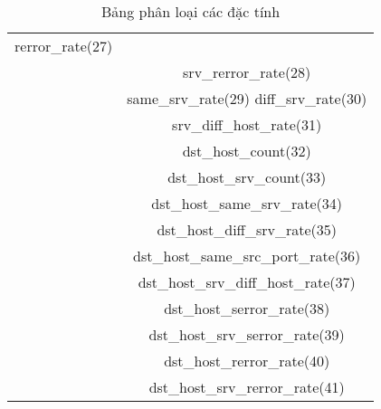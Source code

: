 \begin{table}[!h]
\begin{center}
\begin{tabular}{ | c | c | }
			rerror\_rate(27)                                \\ &
			srv\_rerror\_rate(28)                           \\ &
			same\_srv\_rate(29)
			diff\_srv\_rate(30)                             \\ &
			srv\_diff\_host\_rate(31)                       \\ &
			dst\_host\_count(32)                            \\ &
			dst\_host\_srv\_count(33)                       \\ &
			dst\_host\_same\_srv\_rate(34)                  \\ &
			dst\_host\_diff\_srv\_rate(35)                  \\ &
			dst\_host\_same\_src\_port\_rate(36)            \\ &
			dst\_host\_srv\_diff\_host\_rate(37)            \\ &
			dst\_host\_serror\_rate(38)                     \\ &
			dst\_host\_srv\_serror\_rate(39)                \\ &
			dst\_host\_rerror\_rate(40)                     \\ &
			dst\_host\_srv\_rerror\_rate(41)                \\
			\hline
		\end{tabular}

	\end{center}
	\caption{Bảng phân loại các đặc tính \cite{machinelearning}}
	\label{table:1}
\end{table}
\FloatBarrier

